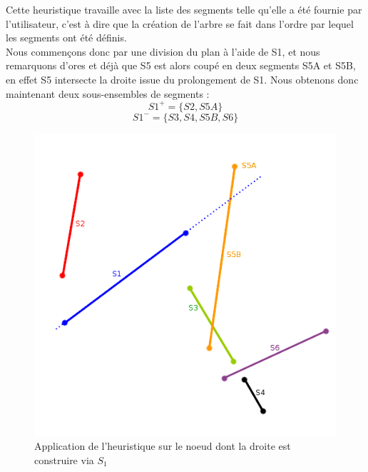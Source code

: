 \documentclass[11pt,a4paper]{article}
\begin{document}
Cette heuristique travaille avec la liste des segments telle qu'elle a été fournie par l'utilisateur, c'est à dire que la création de l'arbre se fait dans l'ordre par lequel les segments ont été définis. \\

Nous commençons donc par une division du plan à l'aide de S1, et nous remarquons d'ores et déjà que S5 est alors coupé en deux segments S5A et S5B, en effet S5 intersecte la droite issue du prolongement de S1. Nous obtenons donc maintenant deux sous-ensembles de segments : 
$$S1^+ = \{S2, S5A\}$$
$$S1^- = \{S3,S4,S5B,S6\}$$

\begin{figure}[H]
\centering
\includegraphics[scale=0.6]{bsp_ex_2.png}
\caption{Application de l'heuristique sur le noeud dont la droite est construire via $S_1$}
\label{bsp_inordre}
\end{figure}
\end{document}
